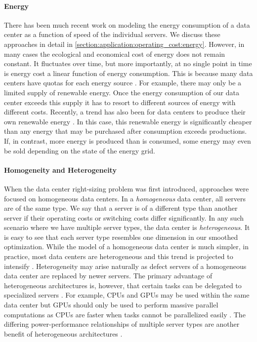 \paragraph{Energy} There has been much recent work on modeling the energy consumption of a data center as a function of speed of the individual servers. We discuss these approaches in detail in \autoref{section:application:operating_cost:energy}. However, in many cases the ecological and economical cost of energy does not remain constant. It fluctuates over time, but more importantly, at no single point in time is energy cost a linear function of energy consumption. This is because many data centers have quotas for each energy source \cite{Miller2021}. For example, there may only be a limited supply of renewable energy. Once the energy consumption of our data center exceeds this supply it has to resort to different sources of energy with different costs. Recently, a trend has also been for data centers to produce their own renewable energy \cite{Lin2012}. In this case, this renewable energy is significantly cheaper than any energy that may be purchased after consumption exceeds productions. If, in contrast, more energy is produced than is consumed, some energy may even be sold depending on the state of the energy grid.

\paragraph{Homogeneity and Heterogeneity} When the data center right-sizing problem was first introduced, approaches were focused on homogeneous data centers. In a \emph{homogeneous} data center, all servers are of the same type. We say that a server is of a different type than another server if their operating costs or switching costs differ significantly. In any such scenario where we have multiple server types, the data center is \emph{heterogeneous}. It is easy to see that each server type resembles one dimension in our smoothed optimization. While the model of a homogeneous data center is much simpler, in practice, most data centers are heterogeneous and this trend is projected to intensify \cite{Jin2016}. Heterogeneity may arise naturally as defect servers of a homogeneous data center are replaced by newer servers. The primary advantage of heterogeneous architectures is, however, that certain tasks can be delegated to specialized servers \cite{Jin2016}. For example, CPUs and GPUs may be used within the same data center but GPUs should only be used to perform massive parallel computations as CPUs are faster when tasks cannot be parallelized easily \cite{Shan2006}. The differing power-performance relationships of multiple server types are another benefit of heterogeneous architectures \cite{Jin2016}.

